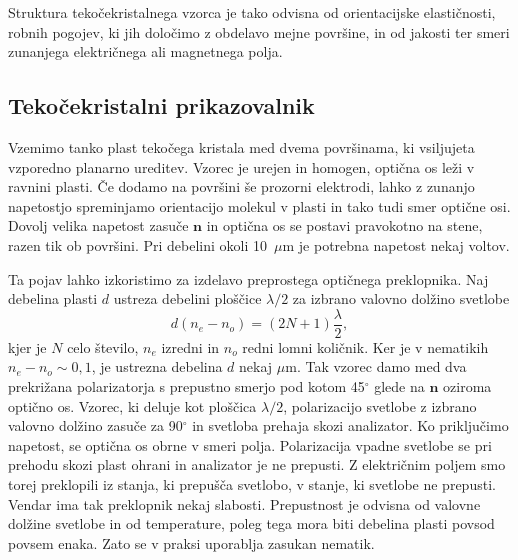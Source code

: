 Struktura tekočekristalnega vzorca je tako odvisna od orientacijske
elastičnosti, robnih pogojev, ki jih določimo z obdelavo mejne
površine, in od jakosti ter smeri zunanjega električnega ali magnetnega polja.

\subsection*{Tekočekristalni prikazovalnik}
Vzemimo tanko plast tekočega kristala med dvema površinama, ki vsiljujeta
vzporedno planarno ureditev. Vzorec je urejen in homogen, optična os leži v ravnini 
plasti. Če dodamo na površini še prozorni elektrodi, lahko
z zunanjo napetostjo spreminjamo orientacijo molekul v plasti in tako tudi 
smer optične osi. Dovolj velika napetost zasuče $\mathbf{n}$ in optična os
se postavi pravokotno na stene, razen tik ob površini. Pri debelini okoli 10~$\mu$m
je potrebna napetost nekaj voltov.

Ta pojav lahko izkoristimo za izdelavo preprostega optičnega preklopnika. 
Naj debelina plasti $d$ ustreza debelini ploščice $\lambda/2$ 
za izbrano valovno dolžino svetlobe 
\begin{equation}
d(n_{e}-n_{o})=(2N+1)\frac{\lambda}{2},
\label{7.57}
\end{equation}
kjer je $N$ celo število, $n_e$ izredni in $n_o$ redni 
lomni količnik. Ker je v nematikih $n_{e}-n_{o}\sim0,1$, 
je ustrezna debelina $d$ nekaj $\mu$m. Tak vzorec damo med dva prekrižana 
polarizatorja s prepustno smerjo pod kotom 45$^\circ$ glede na $\mathbf{n}$
oziroma optično os. Vzorec, ki deluje kot ploščica $\lambda/2$, 
polarizacijo svetlobe z izbrano valovno dolžino zasuče za 90$^\circ$ in 
svetloba prehaja skozi analizator. Ko
priključimo napetost, se optična os obrne v smeri polja. Polarizacija vpadne 
svetlobe se pri prehodu skozi plast ohrani in 
analizator je ne prepusti. Z električnim poljem smo torej preklopili iz
stanja, ki prepušča svetlobo, v stanje, ki svetlobe ne prepusti.
Vendar ima tak preklopnik nekaj slabosti. Prepustnost je odvisna
od valovne dolžine svetlobe in od temperature, poleg tega mora biti debelina 
plasti povsod povsem enaka. Zato se v praksi uporablja zasukan nematik. 

